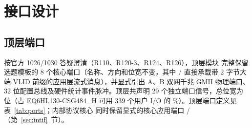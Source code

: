 \chapter{接口设计}\label{ch:if}

\section{顶层端口}

按官方 1026/1030 答疑澄清（R110、R120-3、R124、R126），顶层模块  完整保留选题模板的 8 个核心端口（名称、方向和位宽不变，其中 / 直接承载带 2 字节大端 VLID 前缀的应用层流式消息），并显式引出 A、B 双网千兆 GMII 物理端口、32 位配置总线及硬件统计事件脉冲。顶层共声明 29 个独立端口信号，总位宽为 \Pins{} 位（占 EQ6HL130-CSG484\_H 可用 339 个用户 I/O 的 \PinPct\%）。顶层端口定义见表~\ref{tab:ports}；内部协议核心  同时保留显式的核心应用端口 /（第~\ref{sec:intif}~节）。

